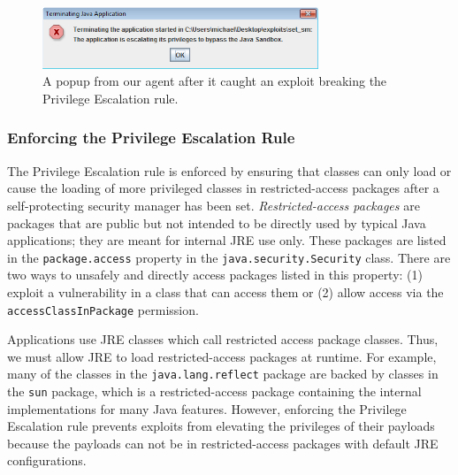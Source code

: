\documentclass{sig-alternate}
\begin{document}
\begin{figure}
\begin{centering}
\includegraphics[width=3.25in]{rule_violation_popup}
\par\end{centering}

\caption{A popup from our agent after it caught an exploit breaking the Privilege
Escalation rule.}
\label{fig:A-popup-from}
\end{figure}



\subsubsection{Enforcing the Privilege Escalation Rule}\label{sub:Enforcing-the-Privilege}

The Privilege Escalation rule is enforced by ensuring that classes
can only load or cause the loading of more privileged classes in restricted-access
packages after a self-protecting security manager has been set. \textit{Restricted-access
packages} are packages that are public but not intended to be directly
used by typical Java applications; they are meant for internal JRE
use only. These packages are listed in the \texttt{package.access}
property in the \texttt{java.security.Security} class. There are two
ways to unsafely and directly access packages listed in this property:
(1) exploit a vulnerability in a class that can access them or (2)
allow access via the \texttt{accessClassInPackage} permission.

Applications use JRE classes which call restricted access package
classes. Thus, we must allow JRE to load restricted-access packages
at runtime. For example, many of the classes in the \texttt{java.lang.reflect}
package are backed by classes in the \texttt{sun} package, which is
a restricted-access package containing the internal implementations
for many Java features. However, enforcing the Privilege Escalation
rule prevents exploits from elevating the privileges of their payloads
because the payloads can not be in restricted-access packages with
default JRE configurations. 
\end{document}
